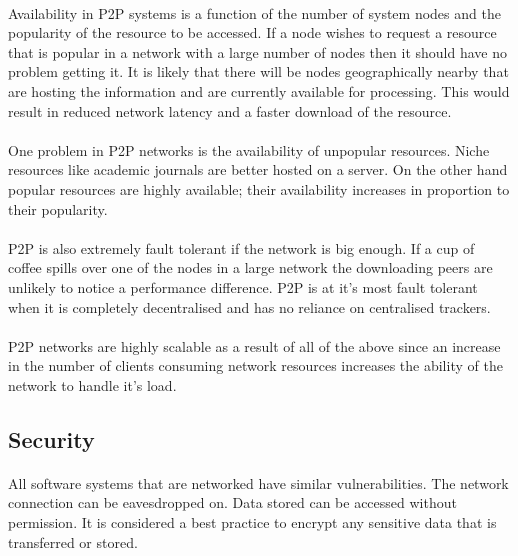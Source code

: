 \documentclass[11pt]{amsart}
\begin{document}
\paragraph{}
Availability in P2P systems is a function of the number of system nodes and the popularity of the resource to be accessed. If a node wishes to request a resource that is popular in a network with a large number of nodes then it should have no problem getting it. It is likely that there will be nodes geographically nearby that are hosting the information and are currently available for processing. This would result in reduced network latency and a faster download of the resource.

\paragraph{}
One problem in P2P networks is the availability of unpopular resources. Niche resources like academic journals are better hosted on a server. On the other hand popular resources are highly available; their availability increases in proportion to their popularity.

\paragraph{}
P2P is also extremely fault tolerant if the network is big enough. If a cup of coffee spills over one of the nodes in a large network the downloading peers are unlikely to notice a performance difference.
P2P is at it's most fault tolerant when it is completely decentralised and has no reliance on centralised trackers.

\paragraph{}
P2P networks are highly scalable as a result of all of the above since an increase in the number of clients consuming network resources increases the ability of the network to handle it's load. 

\subsection{Security}
\paragraph{}
All software systems that are networked have similar vulnerabilities. The network connection can be eavesdropped on. Data stored can be accessed without permission. It is considered a best practice to encrypt any sensitive data that is transferred or stored.
\end{document}
